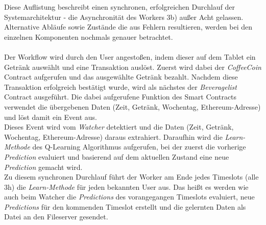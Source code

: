 Diese Auflistung beschreibt einen synchronen, erfolgreichen Durchlauf der Systemarchitektur - die Asynchronität des Workers 3b) außer Acht gelassen. Alternative Abläufe sowie Zustände die aus Fehlern resultieren, werden bei den einzelnen Komponenten nochmals genauer betrachtet.\\\\
Der Workflow wird durch den User angestoßen, indem dieser auf dem Tablet ein Getränk auswählt und eine Transaktion auslöst. Zuerst wird dabei der \textit{CoffeeCoin} Contract aufgerufen und das ausgewählte Getränk bezahlt. Nachdem diese Transaktion erfolgreich bestätigt wurde, wird als nächstes der \textit{Beveragelist} Contract ausgeführt. Die dabei aufgerufene Funktion des Smart Contracts verwendet die übergebenen Daten (Zeit, Getränk, Wochentag, Ethereum-Adresse) und löst damit ein Event aus. \\
Dieses Event wird vom \textit{Watcher} detektiert und die Daten (Zeit, Getränk, Wochentag, Ethereum-Adresse) daraus extrahiert. Daraufhin wird die \textit{Learn-Methode} des Q-Learning Algorithmus aufgerufen, bei der zuerst die vorherige \textit{Prediction} evaluiert und basierend auf dem aktuellen Zustand eine neue \textit{Prediction} gemacht wird. \\
Zu diesem synchronen Durchlauf führt der Worker am Ende jedes Timeslots (alle 3h) die \textit{Learn-Methode} für jeden bekannten User aus. Das heißt es werden wie auch beim Watcher die \textit{Predictions} des vorangegangen Timeslots evaluiert, neue \textit{Predictions} für den kommenden Timeslot erstellt und die gelernten Daten als Datei an den Fileserver gesendet.


